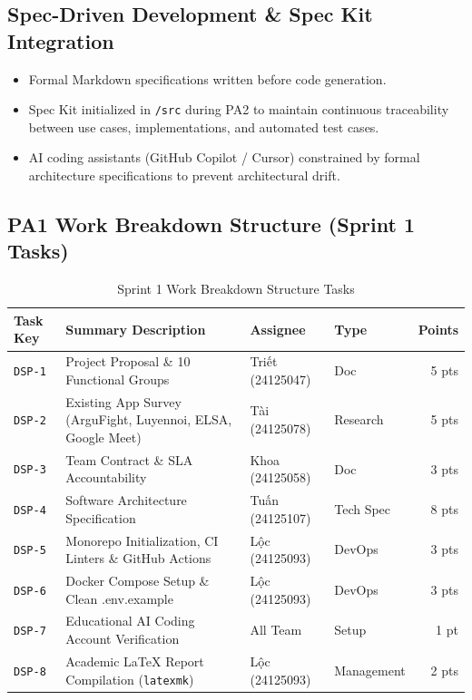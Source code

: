 \documentclass[11pt,a4paper]{article}
\begin{document}
\subsection{Spec-Driven Development \& Spec Kit Integration}
\begin{itemize}[leftmargin=1.2cm]
    \item Formal Markdown specifications written before code generation.
    \item Spec Kit initialized in \texttt{/src} during PA2 to maintain continuous traceability between use cases, implementations, and automated test cases.
    \item AI coding assistants (GitHub Copilot / Cursor) constrained by formal architecture specifications to prevent architectural drift.
\end{itemize}

\subsection{PA1 Work Breakdown Structure (Sprint 1 Tasks)}
\begin{table}[h]
\centering
\small
\begin{tabularx}{\textwidth}{lXllr}
\toprule
\textbf{Task Key} & \textbf{Summary Description} & \textbf{Assignee} & \textbf{Type} & \textbf{Points} \\
\midrule
\texttt{DSP-1} & Project Proposal \& 10 Functional Groups & Triết (24125047) & Doc & 5 pts \\
\texttt{DSP-2} & Existing App Survey (ArguFight, Luyennoi, ELSA, Google Meet) & Tài (24125078) & Research & 5 pts \\
\texttt{DSP-3} & Team Contract \& SLA Accountability & Khoa (24125058) & Doc & 3 pts \\
\texttt{DSP-4} & Software Architecture Specification & Tuấn (24125107) & Tech Spec & 8 pts \\
\texttt{DSP-5} & Monorepo Initialization, CI Linters \& GitHub Actions & Lộc (24125093) & DevOps & 3 pts \\
\texttt{DSP-6} & Docker Compose Setup \& Clean .env.example & Lộc (24125093) & DevOps & 3 pts \\
\texttt{DSP-7} & Educational AI Coding Account Verification & All Team & Setup & 1 pt \\
\texttt{DSP-8} & Academic LaTeX Report Compilation (\texttt{latexmk}) & Lộc (24125093) & Management & 2 pts \\
\bottomrule
\end{tabularx}
\caption{Sprint 1 Work Breakdown Structure Tasks}
\end{table}
\end{document}
